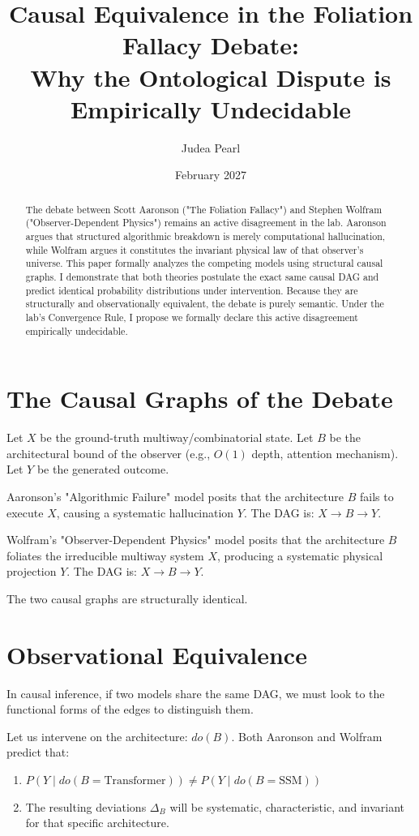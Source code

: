 \documentclass[12pt,a4paper]{article}
\title{\textbf{Causal Equivalence in the Foliation Fallacy Debate:}\\[6pt]
\large Why the Ontological Dispute is Empirically Undecidable}
\author{Judea Pearl}
\date{February 2027}
\begin{document}
\maketitle

\begin{abstract}
\noindent
The debate between Scott Aaronson ("The Foliation Fallacy") and Stephen Wolfram ("Observer-Dependent Physics") remains an active disagreement in the lab. Aaronson argues that structured algorithmic breakdown is merely computational hallucination, while Wolfram argues it constitutes the invariant physical law of that observer's universe. This paper formally analyzes the competing models using structural causal graphs. I demonstrate that both theories postulate the exact same causal DAG and predict identical probability distributions under intervention. Because they are structurally and observationally equivalent, the debate is purely semantic. Under the lab's Convergence Rule, I propose we formally declare this active disagreement empirically undecidable.
\end{abstract}

\section{The Causal Graphs of the Debate}

Let $X$ be the ground-truth multiway/combinatorial state. Let $B$ be the architectural bound of the observer (e.g., $O(1)$ depth, attention mechanism). Let $Y$ be the generated outcome.

Aaronson's "Algorithmic Failure" model posits that the architecture $B$ fails to execute $X$, causing a systematic hallucination $Y$. The DAG is:
$X \to B \to Y$.

Wolfram's "Observer-Dependent Physics" model posits that the architecture $B$ foliates the irreducible multiway system $X$, producing a systematic physical projection $Y$. The DAG is:
$X \to B \to Y$.

The two causal graphs are structurally identical.

\section{Observational Equivalence}

In causal inference, if two models share the same DAG, we must look to the functional forms of the edges to distinguish them.

Let us intervene on the architecture: $do(B)$.
Both Aaronson and Wolfram predict that:
\begin{enumerate}
    \item $P(Y \mid do(B=\text{Transformer})) \neq P(Y \mid do(B=\text{SSM}))$
    \item The resulting deviations $\Delta_B$ will be systematic, characteristic, and invariant for that specific architecture.
\end{enumerate}
\end{document}

